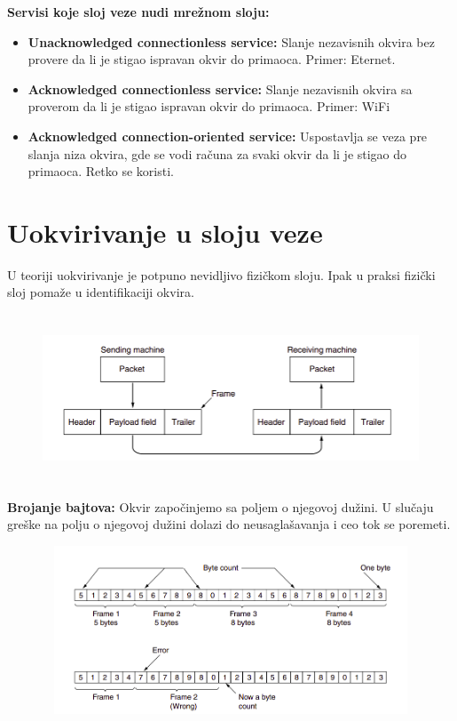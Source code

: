 \documentclass[a4paper]{article}
\begin{document}
    \textbf{Servisi koje sloj veze nudi mrežnom sloju:}
    \begin{itemize}
        \item \textbf{Unacknowledged connectionless service: } Slanje nezavisnih okvira bez provere
              da li je stigao ispravan okvir do primaoca. Primer: Eternet.
        \item \textbf{Acknowledged connectionless service: } Slanje nezavisnih okvira sa proverom
              da li je stigao ispravan okvir do primaoca. Primer: WiFi
        \item \textbf{Acknowledged connection-oriented service: } Uspostavlja se veza pre slanja niza
              okvira, gde se vodi računa za svaki okvir da li je stigao do primaoca. Retko se koristi.
    \end{itemize}

\section{Uokvirivanje u sloju veze}
    U teoriji uokvirivanje je potpuno nevidljivo fizičkom sloju. Ipak u praksi fizički sloj
    pomaže u identifikaciji okvira.

    \begin{figure}[H]
        \begin{center}
            \includegraphics[width=120mm,height=50mm]{Slike/sloj_veze1.png}
        \end{center}
    \end{figure}
    
    \textbf{Brojanje bajtova:}  Okvir započinjemo sa poljem o njegovoj dužini. U slučaju greške na
    polju o njegovoj dužini dolazi do neusaglašavanja i ceo tok se poremeti.
    \begin{figure}[H]
        \begin{center}
            \includegraphics[width=120mm,height=50mm]{Slike/okvirivanje1.png}
        \end{center}
    \end{figure}
\end{document}
